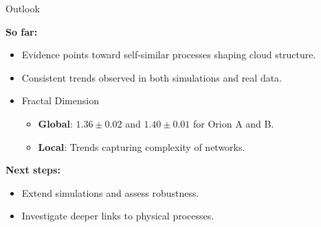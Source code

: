 \documentclass[hyperref={pdfpagelabels=false}, aspectratio=169, t]{beamer}  %
\begin{document}
\begin{textFrame}{Outlook}{}{}

\textbf{So far:}
\begin{itemize}
    \item Evidence points toward self-similar processes shaping cloud structure.
    \item Consistent trends observed in both simulations and real data.
    \item Fractal Dimension
    \begin{itemize}
		\item \textbf{Global}: $\mathbf{1.36 \pm 0.02}$ and $\mathbf{1.40 \pm 0.01}$ for Orion A and B.
		\item \textbf{Local}: Trends capturing complexity of networks.
	\end{itemize} 
\end{itemize}

\vspace{0.8em}
\textbf{Next steps:}
\begin{itemize}
    \item Extend simulations and assess robustness.
    \item Investigate deeper links to physical processes.
\end{itemize}

\end{textFrame}
\end{document}
